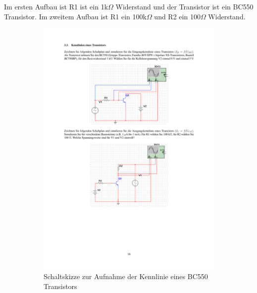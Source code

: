 \documentclass[12pt,a4paper]{article}
\begin{document}
Im ersten Aufbau ist R1 ist ein 1k$\Omega$ Widerstand und der Transistor ist ein BC550 Transistor. Im zweitem Aufbau ist R1 ein 100k$\Omega$ und R2 ein 100$\Omega$ Widerstand.


\begin{figure}[H]
        \centering
        \begin{subfigure}[t]{0.48\textwidth}
               \includegraphics[trim = 30mm 175mm 30mm 40mm, clip, scale = 0.7]{ep5_14[Page16].pdf}
				\caption[Schaltskizze zur Aufnahme der Eingangskennlinie eines BC550 Transistors]{Schaltskizze zur Aufnahme der Kennlinie eines BC550 Transistors\footnotemark}
 				 \label{fig:3.31}
        \end{subfigure}%
        \hfill
        \begin{subfigure}[t]{0.48\textwidth}

\end{subfigure}
\end{figure}
\end{document}
